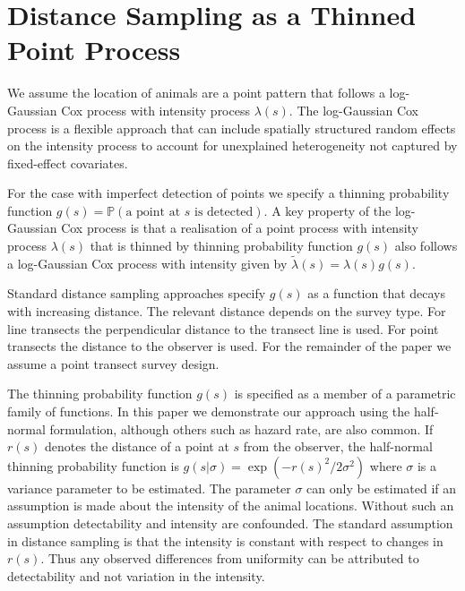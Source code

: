 \documentclass[preprint,12pt]{elsarticle}
\newcommand{\tl}{\tilde{\lambda}}   %
\begin{document}
\section*{Distance Sampling as a Thinned Point Process}

We assume the location of animals are a point pattern that follows a log-Gaussian Cox process with intensity process $\lambda(s)$.  The log-Gaussian Cox process is a flexible approach that can include spatially structured random effects on the intensity process to account for unexplained heterogeneity not captured by fixed-effect covariates.

\sloppy For the case with imperfect detection of points we specify a thinning probability function $g(s) = \mathbb{P}(\text{a point at $s$ is detected})$. A key property of the log-Gaussian Cox process is that a realisation of a point process with intensity process $\lambda(s)$ that is thinned by thinning probability function $g(s)$ also follows a log-Gaussian Cox process with intensity given by $\tl(s) = \lambda(s)g(s)$.

Standard distance sampling approaches specify $g(s)$ as a function that decays with increasing distance.  The relevant distance depends on the survey type.  For line transects the perpendicular distance to the transect line is used.  For point transects the distance to the observer is used.  For the remainder of the paper we assume a point transect survey design.  

The thinning probability function $g(s)$ is specified as a member of a parametric family of functions.  In this paper we demonstrate our approach using the half-normal formulation, although others such as hazard rate, are also common.  If $r(s)$ denotes the distance of a point at $s$ from the observer, the half-normal thinning probability function is $g(s | \sigma) = \exp(-r(s)^2 / 2\sigma^2)$ where $\sigma$ is a variance parameter to be estimated.  The parameter $\sigma$ can only be estimated if an assumption is made about the intensity of the animal locations.  Without such an assumption detectability and intensity are confounded.  The standard assumption in distance sampling is that the intensity is constant with respect to changes in $r(s)$.  Thus any observed differences from uniformity can be attributed to detectability and not variation in the intensity.
\end{document}
